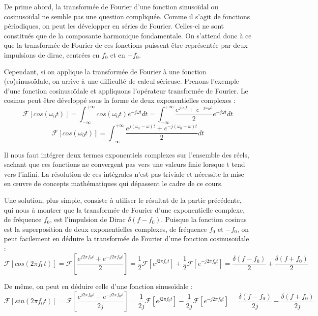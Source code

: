 	De prime abord, la transformée de Fourier d'une fonction sinusoïdal ou cosinusoïdal ne semble pas une question compliquée. Comme il s'agit de fonctions périodiques, on peut les développer en séries de Fourier. Celles-ci ne sont constitués que de la composante harmonique fondamentale. On s'attend donc à ce que la transformée de Fourier de ces fonctions puissent être représentée par deux impulsions de dirac, centrées en $f_0$ et en $-f_0$.
	
	Cependant, si on applique la transformée de Fourier à une fonction (co)sinusoïdale, on arrive à une difficulté de calcul sérieuse. Prenons l'exemple d'une fonction cosinusoïdale et appliquons l'opérateur transformée de Fourier. Le cosinus peut être développé sous la forme de deux exponentielles complexes :
	\begin{equation*}
	\mathcal{F}[cos(\omega_{0}t)]=\int_{-\infty}^{+\infty}cos(\omega_{0}t)e^{-j\omega t}dt=\int_{-\infty}^{+\infty}\frac{e^{j\omega_{0}t}+e^{-j\omega_{0}t}}{2}e^{-j\omega t}dt
	\end{equation*}
	\begin{equation*}
	\mathcal{F}[cos(\omega_{0}t)]=\int_{-\infty}^{+\infty}\frac{e^{j(\omega_{0}-\omega)t}+e^{-j(\omega_{0}+\omega)t}}{2}dt
	\end{equation*}
	
	Il nous faut intégrer deux termes exponentiels complexes sur l'ensemble des réels, sachant que ces fonctions ne convergent pas vers une valeurs finie lorsque t tend vers l'infini. La résolution de ces intégrales n'est pas triviale et nécessite la mise en œuvre de concepts mathématiques qui dépassent le cadre de ce cours.
	
	Une solution, plus simple, consiste à utiliser le résultat de la partie précédente, qui nous à montrer que la transformée de Fourier d'une exponentielle complexe, de fréquence $f_0$, est l'impulsion de Dirac $\delta(f-f_0)$. Puisque la fonction cosinus est la superposition de deux exponentielles complexes, de fréquence $f_0$ et $-f_0$, on peut facilement en déduire la transformée de Fourier d'une fonction cosinusoïdale :
	\begin{equation}\label{key}
	\mathcal{F}[cos(2\pi f_0 t)]=	\mathcal{F}[\frac{e^{j2\pi f_0 t}+e^{-j2\pi f_0 t}}{2}]=\frac{1}{2}	\mathcal{F}[e^{j2\pi f_0 t}]+\frac{1}{2}\mathcal{F}[e^{-j2\pi f_0 t}]=\frac{\delta(f-f_0)}{2}+\frac{\delta(f+f_0)}{2}
	\end{equation}  
	
	De même, on peut en déduire celle d'une fonction sinusoïdale :
	\begin{equation}\label{key}
	\mathcal{F}[sin(2\pi f_0 t)]=	\mathcal{F}[\frac{e^{j2\pi f_0 t}-e^{-j2\pi f_0 t}}{2j}]=\frac{1}{2j}	\mathcal{F}[e^{j2\pi f_0 t}]-\frac{1}{2j}\mathcal{F}[e^{-j2\pi f_0 t}]=\frac{\delta(f-f_0)}{2j}-\frac{\delta(f+f_0)}{2j}
	\end{equation}  
	
